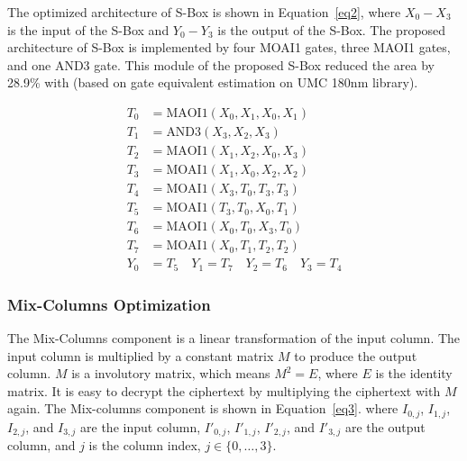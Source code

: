 \documentclass[sn-basic]{sn-jnl}%
\begin{document}
The optimized architecture of S-Box is shown in Equation~\ref{eq2}, where $X_0-X_3$ is the input of the S-Box and $Y_0-Y_3$ is the output of the S-Box.
The proposed architecture of S-Box is implemented by four MOAI1 gates, three MAOI1 gates, and one AND3 gate.
This module of the proposed S-Box reduced the area by 28.9\% with \cite{bao2019peigen} (based on gate equivalent estimation on UMC 180nm library).

\begin{align}
    T_0 & = \text{MAOI1}(X_0, X_1, X_0, X_1) \nonumber          \\
    T_1 & = \text{AND3}(X_3, X_2, X_3) \nonumber                \\
    T_2 & = \text{MAOI1}(X_1, X_2, X_0, X_3) \nonumber          \\
    T_3 & = \text{MOAI1}(X_1, X_0, X_2, X_2) \nonumber          \\
    T_4 & = \text{MOAI1}(X_3, T_0, T_3, T_3) \nonumber          \\
    T_5 & = \text{MOAI1}(T_3, T_0, X_0, T_1) \nonumber          \\
    T_6 & = \text{MAOI1}(X_0, T_0, X_3, T_0) \nonumber          \\
    T_7 & = \text{MOAI1}(X_0, T_1, T_2, T_2) \nonumber          \\
    Y_0 & = T_5 \quad Y_1 = T_7 \quad Y_2 = T_6 \quad Y_3 = T_4
    \label{eq2}
\end{align}

\subsubsection{Mix-Columns Optimization}\label{subsubsec2}

The Mix-Columns component is a linear transformation of the input column.
The input column is multiplied by a constant matrix $M$ to produce the output column.
$M$ is a involutory matrix, which means $M^2 = E$, where $E$ is the identity matrix.
It is easy to decrypt the ciphertext by multiplying the ciphertext with $M$ again.
The Mix-columns component is shown in Equation~\ref{eq3}.
where $I_{0,j}$, $I_{1,j}$, $I_{2,j}$, and $I_{3,j}$ are the input column, $I'_{0,j}$, $I'_{1,j}$, $I'_{2,j}$, and $I'_{3,j}$ are the output column, and $j$ is the column index, $j \in \{0,\dots,3\}$.
\end{document}
